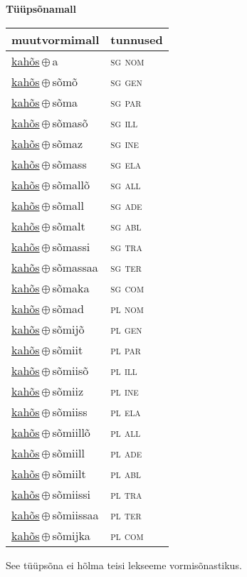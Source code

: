 

\vspace{3.5em}
\noindent \begin{minipage}{\textwidth}
\noindent \textbf{Tüüpsõnamall \,}\\

\begin{sideways}
\begin{tabular}{l l}
muutvormimall & tunnused \\
\hline
\underline{kahõs}\,$\oplus$\,a & \textsc{ sg nom } \\
\underline{kahõs}\,$\oplus$\,sõmõ & \textsc{ sg gen } \\
\underline{kahõs}\,$\oplus$\,sõma & \textsc{ sg par } \\
\underline{kahõs}\,$\oplus$\,sõmasõ & \textsc{ sg ill } \\
\underline{kahõs}\,$\oplus$\,sõmaz & \textsc{ sg ine } \\
\underline{kahõs}\,$\oplus$\,sõmass & \textsc{ sg ela } \\
\underline{kahõs}\,$\oplus$\,sõmallõ & \textsc{ sg all } \\
\underline{kahõs}\,$\oplus$\,sõmall & \textsc{ sg ade } \\
\underline{kahõs}\,$\oplus$\,sõmalt & \textsc{ sg abl } \\
\underline{kahõs}\,$\oplus$\,sõmassi & \textsc{ sg tra } \\
\underline{kahõs}\,$\oplus$\,sõmassaa & \textsc{ sg ter } \\
\underline{kahõs}\,$\oplus$\,sõmaka & \textsc{ sg com } \\
\underline{kahõs}\,$\oplus$\,sõmad & \textsc{ pl nom } \\
\underline{kahõs}\,$\oplus$\,sõmijõ & \textsc{ pl gen } \\
\underline{kahõs}\,$\oplus$\,sõmiit & \textsc{ pl par } \\
\underline{kahõs}\,$\oplus$\,sõmiisõ & \textsc{ pl ill } \\
\underline{kahõs}\,$\oplus$\,sõmiiz & \textsc{ pl ine } \\
\underline{kahõs}\,$\oplus$\,sõmiiss & \textsc{ pl ela } \\
\underline{kahõs}\,$\oplus$\,sõmiillõ & \textsc{ pl all } \\
\underline{kahõs}\,$\oplus$\,sõmiill & \textsc{ pl ade } \\
\underline{kahõs}\,$\oplus$\,sõmiilt & \textsc{ pl abl } \\
\underline{kahõs}\,$\oplus$\,sõmiissi & \textsc{ pl tra } \\
\underline{kahõs}\,$\oplus$\,sõmiissaa & \textsc{ pl ter } \\
\underline{kahõs}\,$\oplus$\,sõmijka & \textsc{ pl com } \\
\end{tabular}
\end{sideways}
\label{tab:tüüpsõnamall-kahõsa}

\end{minipage}

 
\vspace{1em}
\noindent See tüüpsõna ei hõlma teisi lekseeme vormi\-sõnastikus.
